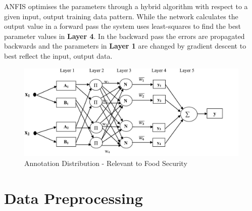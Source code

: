  
 ANFIS optimises the parameters through a hybrid algorithm with respect to a given input, output training data pattern. While the  network calculates the output value in a forward pass the system uses least-squares to find the best parameter values in \textbf{Layer 4}. In the backward pass the errors are propagated backwards and the parameters in \textbf{Layer 1} are changed by gradient descent to best reflect the input, output data.
 
  




\begin{figure}[H]
        \centering
         \includegraphics[width=1\textwidth ]{img/model/gnn_fuzz}      
        \caption{Annotation Distribution - Relevant to Food Security}
        \label{fig:gnn_fuzz}
\end{figure}





\section{Data Preprocessing}
\label{dataprocessing}

